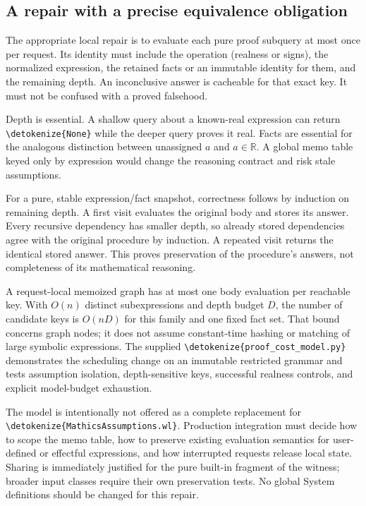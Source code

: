 \documentclass[11pt,letterpaper]{article}
\newcommand{\code}[1]{\expandafter\nolinkurl\expandafter{\detokenize{#1}}}
\begin{document}
\subsection{A repair with a precise equivalence obligation}

The appropriate local repair is to evaluate each pure proof subquery at most once per request. Its identity must include the operation (realness or signs), the normalized expression, the retained facts or an immutable identity for them, and the remaining depth. An inconclusive answer is cacheable for that exact key. It must not be confused with a proved falsehood.

Depth is essential. A shallow query about a known-real expression can return \code{None} while the deeper query proves it real. Facts are essential for the analogous distinction between unassigned $a$ and $a\in\mathbb R$. A global memo table keyed only by expression would change the reasoning contract and risk stale assumptions.

For a pure, stable expression/fact snapshot, correctness follows by induction on remaining depth. A first visit evaluates the original body and stores its answer. Every recursive dependency has smaller depth, so already stored dependencies agree with the original procedure by induction. A repeated visit returns the identical stored answer. This proves preservation of the procedure's answers, not completeness of its mathematical reasoning.

A request-local memoized graph has at most one body evaluation per reachable key. With $O(n)$ distinct subexpressions and depth budget $D$, the number of candidate keys is $O(nD)$ for this family and one fixed fact set. That bound concerns graph nodes; it does not assume constant-time hashing or matching of large symbolic expressions. The supplied \code{proof_cost_model.py} demonstrates the scheduling change on an immutable restricted grammar and tests assumption isolation, depth-sensitive keys, successful realness controls, and explicit model-budget exhaustion.

The model is intentionally not offered as a complete replacement for \code{MathicsAssumptions.wl}. Production integration must decide how to scope the memo table, how to preserve existing evaluation semantics for user-defined or effectful expressions, and how interrupted requests release local state. Sharing is immediately justified for the pure built-in fragment of the witness; broader input classes require their own preservation tests. No global System definitions should be changed for this repair.
\end{document}
